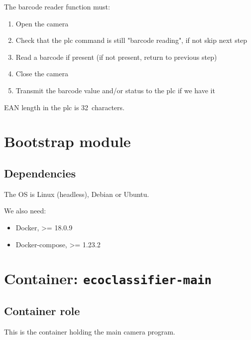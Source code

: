 The barcode reader function must:

\begin{enumerate}
    \item Open the camera
    \item Check that the \gls{plc} command is still "barcode reading", if not skip next step
    \item Read a barcode if present (if not present, return to previous step)
    \item Close the camera
    \item Transmit the barcode value and/or status to the \gls{plc} if we have it
\end{enumerate}



EAN length in the \gls{plc} is 32~characters.

\section{Bootstrap module}

\subsection{Dependencies}

The OS is Linux (headless), Debian or Ubuntu.


We also need:

\begin{itemize}
    \item Docker, >= 18.0.9
    \item Docker-compose, >= 1.23.2
\end{itemize}


\section{Container: \texttt{ecoclassifier-main}}

\subsection{Container role}

This is the container holding the main camera program.


